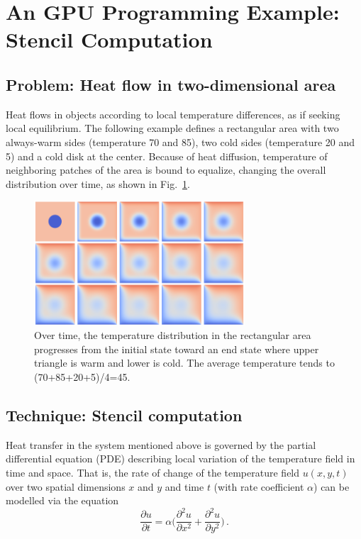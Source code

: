 \section{An GPU Programming Example: Stencil Computation}\label{sec:stencil_example}


\subsection{Problem: Heat flow in two-dimensional area}


\par
Heat flows in objects according to local temperature differences, as if seeking local equilibrium.
The following example defines a rectangular area with two always-warm sides (temperature 70 and 85), two cold sides (temperature 20 and 5) and a cold disk at the center.
Because of heat diffusion, temperature of neighboring patches of the area is bound to equalize, changing the overall distribution over time, as shown in Fig.~\ref{fig:heat_montage}.

\begin{figure}[!htbp]
\centering\includegraphics[width=0.7\textwidth]{fig_problem/heat_montage.png}
\caption{Over time, the temperature distribution in the rectangular area progresses from the initial state toward an end state where upper triangle is warm and lower is cold. The average temperature tends to (70+85+20+5)/4=45.}\label{fig:heat_montage}
\end{figure}




\subsection{Technique: Stencil computation}


\par
Heat transfer in the system mentioned above is governed by the partial differential equation (PDE) describing local variation of the temperature field in time and space.
That is, the rate of change of the temperature field $u(x,y,t)$ over two spatial dimensions $x$ and $y$ and time $t$ (with rate coefficient $\alpha$) can be modelled via the equation
\begin{equation}
    \frac{\partial u}{\partial t} = \alpha \Big(\frac{\partial^2u}{\partial x^2} + \frac{\partial^2u}{\partial y^2}\Big) \,. \label{eq:heat_diffusion_pde}
\end{equation}

